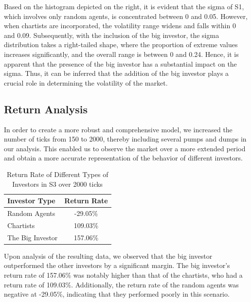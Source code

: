\documentclass[a4paper, 12pt]{article}
\begin{document}
Based on the histogram depicted on the right, it is evident that the sigma of S1, which involves only random agents, is concentrated between 0 and 0.05. However, when chartists are incorporated, the volatility range widens and falls within 0 and 0.09. Subsequently, with the inclusion of the big investor, the sigma distribution takes a right-tailed shape, where the proportion of extreme values increases significantly, and the overall range is between 0 and 0.24. Hence, it is apparent that the presence of the big investor has a substantial impact on the sigma. Thus, it can be inferred that the addition of the big investor plays a crucial role in determining the volatility of the market.\par

\subsection{Return Analysis}
\vspace{\baselineskip}
In order to create a more robust and comprehensive model, we increased the number of ticks from 150 to 2000, thereby including several pumps and dumps in our analysis. This enabled us to observe the market over a more extended period and obtain a more accurate representation of the behavior of different investors.\par

\begin{table}[h]
\centering
\caption{Return Rate of Different Types of Investors in S3 over 2000 ticks}
\label{tab:returnrate}
\begin{tabular}{@{}lc@{}}
\toprule
\textbf{Investor Type} & \textbf{Return Rate} \\ \midrule
Random Agents & -29.05\% \\
Chartists & 109.03\% \\
The Big Investor & 157.06\% \\ \bottomrule
\end{tabular}
\end{table}

Upon analysis of the resulting data, we observed that the big investor outperformed the other investors by a significant margin. The big investor's return rate of 157.06\% was notably higher than that of the chartists, who had a return rate of 109.03\%. Additionally, the return rate of the random agents was negative at -29.05\%, indicating that they performed poorly in this scenario.\par
\end{document}
